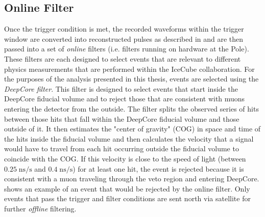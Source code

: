 \subsection{Online Filter}

Once the trigger condition is met, the recorded waveforms within the trigger window are converted into reconstructed pulses as described in  and are then passed into a set of \emph{online} filters (i.e. filters running on hardware at the Pole).
These filters are each designed to select events that are relevant to different physics measurements that are performed within the IceCube collaboration.
For the purposes of the analysis presented in this thesis, events are selected using the \emph{DeepCore filter}.
This filter is designed to select events that start inside the DeepCore fiducial volume and to reject those that are consistent with muons entering the detector from the outside.
The filter splits the observed series of hits between those hits that fall within the DeepCore fiducial volume and those outside of it.
It then estimates the "center of gravity" (COG) in space and time of the hits inside the fiducial volume and then calculates the velocity that a signal would have to travel from each hit occurring outside the fiducial volume to coincide with the COG.
If this velocity is close to the speed of light (between $0.25\;\mathrm{ns/s}$ and $0.4\;\mathrm{ns/s}$) for at least one hit, the event is rejected because it is consistent with a muon traveling through the veto region and entering DeepCore.
 shows an example of an event that would be rejected by the online filter.
Only events that pass the trigger and filter conditions are sent north via satellite for further \emph{offline} filtering.
